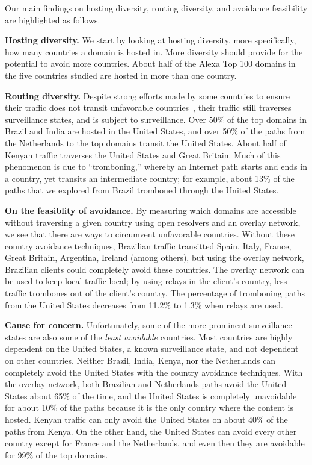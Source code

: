 Our main findings on hosting diversity, routing diversity, and avoidance 
feasibility are highlighted as follows.

{\bf Hosting diversity.} We start by looking at hosting diversity, more specifically, how many
countries a domain is hosted in.  More diversity should provide for the
potential to avoid more countries.  About half of the
Alexa Top 100 domains in the five countries studied are hosted in more
than one country. 

{\bf Routing diversity.} Despite strong efforts made by some countries to ensure their traffic does 
not transit unfavorable countries~\cite{brazil_history, brazil_break_from_US, brazil_conference,
  brazil_conference2, brazil_human_rights},
their traffic still traverses surveillance states, and is
subject to surveillance.  Over 50\% of the top domains in
Brazil and India are hosted in the United States, and over 50\% of the
paths from the Netherlands to the top domains transit the
United States.  About half of Kenyan traffic traverses the United States
and Great Britain.  Much of this phenomenon is
due to ``tromboning,'' whereby an Internet path starts and ends in a
country, yet transits an intermediate country; for example, about 13\%
of the paths that we explored from Brazil tromboned through the United States. 

{\bf On the feasiblity of avoidance.} By measuring which domains are accessible without traversing a given
country using open resolvers and an overlay network, we see that
there are ways to circumvent unfavorable countries.  Without these
country avoidance techniques, Brazilian traffic transitted Spain, Italy,
France, Great Britain, Argentina, Ireland (among others), but using the
overlay network, Brazilian clients could completely avoid these
countries.  The overlay network can be used to
keep local traffic local; by using relays in the client's country, less
traffic trombones out of the client's country.  The percentage of tromboning paths
from the United States decreases from 11.2\% to 1.3\% when
relays are used.   

{\bf Cause for concern.} Unfortunately, some of the more prominent surveillance states are also
some of the \textit{least avoidable} countries.  Most countries are
highly dependent on the United States, a known surveillance state, and
not dependent on other countries.  Neither Brazil, India, Kenya, nor the
Netherlands can completely avoid the United States with the country
avoidance techniques.  With the overlay network, both Brazilian and
Netherlands paths avoid the United States about 65\% of the time, and
the United States is completely unavoidable for about 10\% of the paths
because it is the only country where the content is hosted.  Kenyan traffic can
only avoid the United States on about 40\% of the paths from Kenya.  On the other hand, the United States can avoid
every other country except for France and the Netherlands, and even then
they are avoidable for 99\% of the top domains. 

